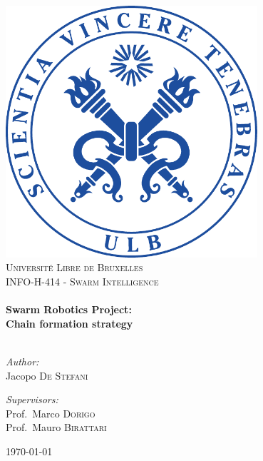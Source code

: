 \begin{titlepage}

\begin{center}


\includegraphics[width=0.70\textwidth]{./Figures/logo-ulb}\\[1cm]    

\textsc{\LARGE Université Libre de Bruxelles}\\[1.5cm]

\textsc{\Large INFO-H-414 - Swarm Intelligence}\\[0.5cm]


\HRule \\[0.4cm]
{ \huge \bfseries Swarm Robotics Project: \\ Chain formation strategy}\\[0.4cm]

\HRule \\[1cm]

\begin{minipage}{0.4\textwidth}
\begin{flushleft} \large
\emph{Author:}\\
Jacopo  \textsc{De Stefani}
\end{flushleft}
\end{minipage}
\begin{minipage}{0.4\textwidth}
\begin{flushright} \large
\emph{Supervisors:} \\
Prof.~Marco \textsc{Dorigo}\\
Prof.~Mauro \textsc{Birattari}
\end{flushright}
\end{minipage}

\vfill

{\large \today}

\end{center}

\end{titlepage}
